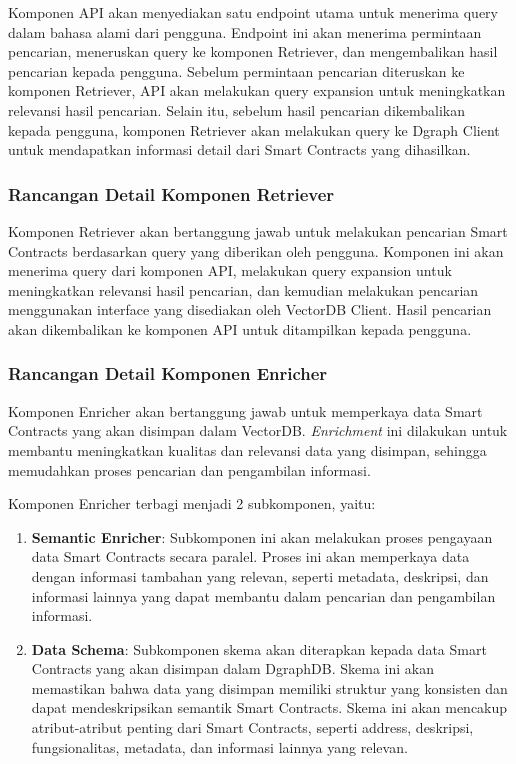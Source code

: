 Komponen API akan menyediakan satu endpoint utama untuk menerima query dalam bahasa alami dari pengguna. Endpoint ini akan menerima permintaan pencarian, meneruskan query ke komponen Retriever, dan mengembalikan hasil pencarian kepada pengguna. Sebelum permintaan pencarian diteruskan ke komponen Retriever, API akan melakukan query expansion untuk meningkatkan relevansi hasil pencarian. Selain itu, sebelum hasil pencarian dikembalikan kepada pengguna, komponen Retriever akan melakukan query ke Dgraph Client untuk mendapatkan informasi detail dari Smart Contracts yang dihasilkan.

\subsubsection{Rancangan Detail Komponen Retriever}

Komponen Retriever akan bertanggung jawab untuk melakukan pencarian Smart Contracts berdasarkan query yang diberikan oleh pengguna. Komponen ini akan menerima query dari komponen API, melakukan query expansion untuk meningkatkan relevansi hasil pencarian, dan kemudian melakukan pencarian menggunakan interface yang disediakan oleh VectorDB Client. Hasil pencarian akan dikembalikan ke komponen API untuk ditampilkan kepada pengguna.

\subsubsection{Rancangan Detail Komponen Enricher}

Komponen Enricher akan bertanggung jawab untuk memperkaya data Smart Contracts yang akan disimpan dalam VectorDB. \textit{Enrichment} ini dilakukan untuk membantu meningkatkan kualitas dan relevansi data yang disimpan, sehingga memudahkan proses pencarian dan pengambilan informasi.

Komponen Enricher terbagi menjadi 2 subkomponen, yaitu:
\begin{enumerate}
	\item \textbf{Semantic Enricher}: Subkomponen ini akan melakukan proses pengayaan data Smart Contracts secara paralel. Proses ini akan memperkaya data dengan informasi tambahan yang relevan, seperti metadata, deskripsi, dan informasi lainnya yang dapat membantu dalam pencarian dan pengambilan informasi.
	\item \textbf{Data Schema}:
	      Subkomponen skema akan diterapkan kepada data Smart Contracts yang akan disimpan dalam DgraphDB. Skema ini akan memastikan bahwa data yang disimpan memiliki struktur yang konsisten dan dapat mendeskripsikan semantik Smart Contracts. Skema ini akan mencakup atribut-atribut penting dari Smart Contracts, seperti address, deskripsi, fungsionalitas, metadata, dan informasi lainnya yang relevan.
\end{enumerate}

